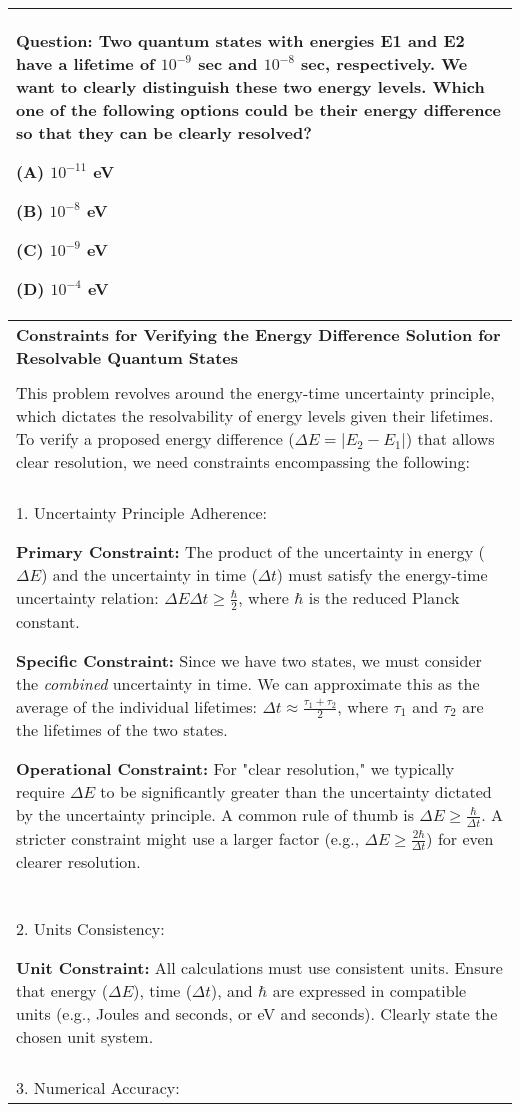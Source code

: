 \begin{table*}
\centering
\footnotesize
\begin{tabular}{p{\linewidth}}
\toprule
\textbf{Question:} Two quantum states with energies E1 and E2 have a lifetime of $10^{-9}$ sec and $10^{-8}$ sec, respectively. We want to clearly distinguish these two energy levels. Which one of the following options could be their energy difference so that they can be clearly resolved?

(A) $10^{-11}$ eV

(B) $10^{-8}$ eV

(C) $10^{-9}$ eV

(D) $10^{-4}$ eV \\ \midrule

\textbf{Constraints for Verifying the Energy Difference Solution for Resolvable Quantum States}
\\ \\
This problem revolves around the energy-time uncertainty principle, which dictates the resolvability of energy levels given their lifetimes. To verify a proposed energy difference ($\Delta E = |E_2 - E_1|$) that allows clear resolution, we need constraints encompassing the following:
\\\\
1. Uncertainty Principle Adherence:

\textbf{Primary Constraint:} The product of the uncertainty in energy ($\Delta E$) and the uncertainty in time ($\Delta t$) must satisfy the energy-time uncertainty relation: $\Delta E \Delta t \geq \frac{\hbar}{2}$, where $\hbar$ is the reduced Planck constant.

\textbf{Specific Constraint:} Since we have two states, we must consider the \textit{combined} uncertainty in time. We can approximate this as the average of the individual lifetimes: $\Delta t \approx \frac{\tau_1 + \tau_2}{2}$, where $\tau_1$ and $\tau_2$ are the lifetimes of the two states.

\textbf{Operational Constraint:} For "clear resolution," we typically require $\Delta E$ to be significantly greater than the uncertainty dictated by the uncertainty principle. A common rule of thumb is $\Delta E \geq \frac{\hbar}{\Delta t}$. A stricter constraint might use a larger factor (e.g., $\Delta E \geq \frac{2\hbar}{\Delta t}$) for even clearer resolution.
\\\\
2. Units Consistency:

\textbf{Unit Constraint:} All calculations must use consistent units. Ensure that energy ($\Delta E$), time ($\Delta t$), and $\hbar$ are expressed in compatible units (e.g., Joules and seconds, or eV and seconds). Clearly state the chosen unit system.
\\\\
3. Numerical Accuracy:


\end{tabular}
\end{table*}
